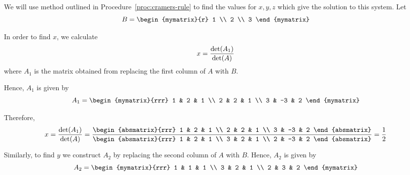 \begin{solution} We will use method outlined in Procedure~\ref{proc:cramers-rule} to find the values for
$x,y,z$ which give the solution to this system. 
Let
\begin{equation*}
B = 
\begin{mymatrix}{r}
1 \\
2 \\
3
\end{mymatrix} 
\end{equation*}

In order to find $x$, we calculate
\begin{equation*}
x =
\vspace{0.05in}\frac{\det (A_{1})}{\det (A)}
\end{equation*}
where $A_1$ is the matrix obtained from replacing the first column of $A$ with $B$.

Hence, $A_1$ is given by 
\begin{equation*}
A_1 = 
\begin{mymatrix}{rrr}
1 & 2 & 1 \\
2 & 2 & 1 \\
3 & -3 & 2
\end{mymatrix}
\end{equation*}

Therefore,
\begin{equation*}
x=
\vspace{0.05in}\frac{\det (A_{1})}{\det (A)}
=
\vspace{0.05in}\frac{\begin{absmatrix}{rrr}
1 &  2 & 1 \\
2 &  2 & 1 \\
3 & -3 & 2
\end{absmatrix} }{\begin{absmatrix}{rrr}
1 & 2 & 1 \\
3 & 2 & 1 \\
2 & -3 & 2
\end{absmatrix} }=\vspace{0.05in}\frac{1}{2}
\end{equation*}

Similarly, to find $y$ we construct $A_2$ by replacing the second column of $A$ with $B$. Hence, $A_2$ is given by
\begin{equation*}
A_2
=
\begin{mymatrix}{rrr}
1 & 1 & 1 \\
3 & 2 & 1 \\
2 & 3 & 2
\end{mymatrix}
\end{equation*}


\end{solution}
